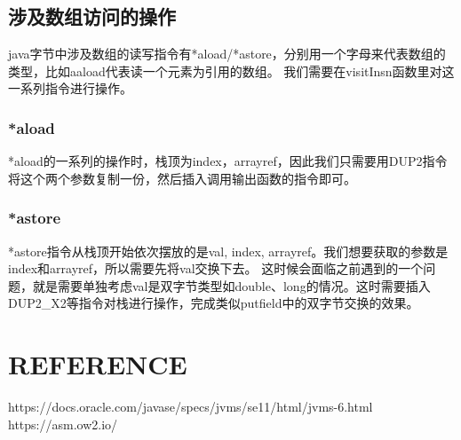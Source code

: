 \documentclass[UTF8]{article}
\begin{document}
\subsection{涉及数组访问的操作}
java字节中涉及数组的读写指令有*aload/*astore，分别用一个字母来代表数组的类型，比如aaload代表读一个元素为引用的数组。
我们需要在visitInsn函数里对这一系列指令进行操作。

\subsubsection{*aload}
*aload的一系列的操作时，栈顶为index，arrayref，因此我们只需要用DUP2指令将这个两个参数复制一份，然后插入调用输出函数的指令即可。

\subsubsection{*astore}
*astore指令从栈顶开始依次摆放的是val, index, arrayref。我们想要获取的参数是index和arrayref，所以需要先将val交换下去。
这时候会面临之前遇到的一个问题，就是需要单独考虑val是双字节类型如double、long的情况。这时需要插入DUP2\_X2等指令对栈进行操作，完成类似putfield中的双字节交换的效果。


\section{REFERENCE}
https://docs.oracle.com/javase/specs/jvms/se11/html/jvms-6.html
https://asm.ow2.io/
\end{document}
